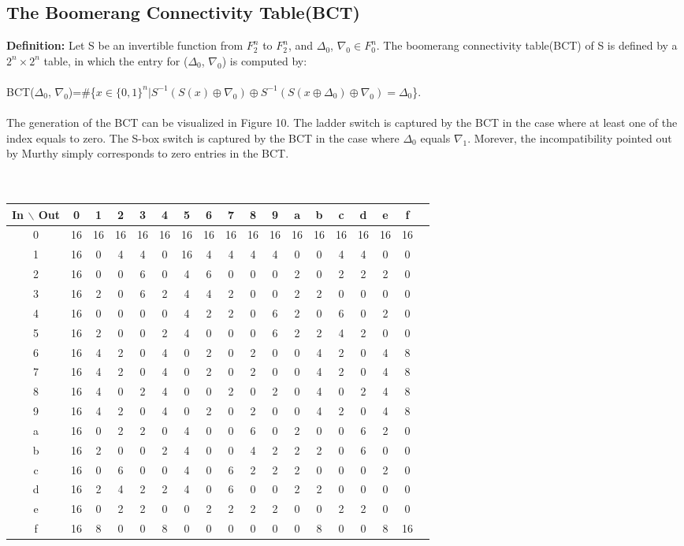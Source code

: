 \documentclass{article}
\begin{document}
\subsection{The Boomerang Connectivity Table(BCT)}
\textbf{Definition:} Let S be an invertible function from $F_2^n$ to $F_2^n$, and $\Delta_0$, $\nabla_0 \in F_0^n$. The boomerang connectivity table(BCT) of S is defined by a $2^n \times 2^n$ table, in which the entry for ($\Delta_0$, $\nabla_0$) is computed by:\\\\
BCT($\Delta_0$, $\nabla_0$)=\#\{$x \in \{0,1\}^n|S^{-1}(S(x)\oplus \nabla_0)\oplus S^{-1}(S(x\oplus\Delta_0 )\oplus \nabla_0) = \Delta_0$\}.\\\\
The generation of the BCT can be visualized in Figure 10. The ladder switch is captured by the BCT in the case where at least one of the index equals to zero. The S-box switch is captured by the BCT in the case where $\Delta_0$ equals $\nabla_1$. Morever, the incompatibility pointed out by Murthy simply corresponds to zero entries in the BCT.\\\\\\
\begin{tabular}{c||c c c c c c c c c c c c c c c c c|}
	In $\backslash$ Out &0 &1 & 2 & 3 &4&5&6&7&8&9&a&b&c&d&e&f\\
	\hline\hline
0&16 &16& 16& 16& 16& 16& 16& 16& 16& 16& 16& 16& 16& 16& 16& 16 \\
1&16  &0  &4  &4  &0 &16  &4  &4  &4  &4&  0  &0&  4&  4&  0  &0 \\
2&16  &0  &0  &6  &0  &4  &6  &0  &0  &0&  2& 0&  2&  2&  2  &0 \\
3&16  &2  &0  &6  &2  &4  &4  &2  &0  &0  &2  &2  &0  &0  &0  &0 \\
4&16  &0  &0  &0  &0  &4  &2  &2  &0  &6  &2  &0  &6  &0  &2  &0 \\
5&16  &2  &0  &0  &2  &4  &0  &0  &0  &6  &2  &2  &4  &2  &0  &0 \\
6&16  &4  &2  &0  &4  &0  &2  &0  &2  &0  &0  &4  &2  &0  &4  &8 \\
7&16  &4  &2  &0  &4  &0  &2  &0  &2  &0  &0  &4  &2  &0  &4  &8 \\
8&16  &4  &0  &2  &4  &0  &0  &2  &0  &2  &0  &4  &0  &2  &4  &8 \\
9&16  &4  &2  &0  &4  &0  &2  &0  &2  &0  &0  &4  &2  &0  &4  &8 \\
a&16  &0  &2  &2  &0  &4  &0  &0  &6  &0  &2  &0  &0  &6  &2  &0 \\
b&16  &2  &0  &0  &2  &4  &0  &0  &4  &2  &2  &2  &0  &6  &0  &0 \\
c&16  &0  &6  &0  &0  &4  &0  &6  &2  &2  &2  &0  &0  &0  &2  &0 \\
d&16  &2  &4  &2  &2  &4  &0  &6  &0  &0  &2  &2  &0  &0  &0  &0 \\
e&16  &0  &2  &2  &0  &0  &2  &2  &2  &2  &0  &0  &2  &2  &0  &0 \\
f&16  &8  &0  &0  &8  &0  &0  &0  &0  &0  &0  &8  &0  &0  &8 &16 \\
\end{tabular}\\\\\\
\end{document}
